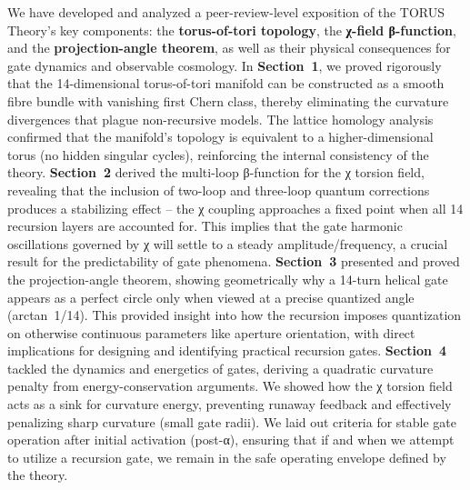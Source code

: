 \documentclass[]{article}
\begin{document}
We have developed and analyzed a peer-review-level exposition of the
TORUS Theory's key components: the \textbf{torus-of-tori topology}, the
\textbf{χ-field β-function}, and the \textbf{projection-angle theorem},
as well as their physical consequences for gate dynamics and observable
cosmology. In \textbf{Section~1}, we proved rigorously that the
14-dimensional torus-of-tori manifold can be constructed as a smooth
fibre bundle with vanishing first Chern class, thereby eliminating the
curvature divergences that plague non-recursive models. The lattice
homology analysis confirmed that the manifold's topology is equivalent
to a higher-dimensional torus (no hidden singular cycles), reinforcing
the internal consistency of the theory. \textbf{Section~2} derived the
multi-loop β-function for the χ torsion field, revealing that the
inclusion of two-loop and three-loop quantum corrections produces a
stabilizing effect -- the χ coupling approaches a fixed point when all
14 recursion layers are accounted for. This implies that the gate
harmonic oscillations governed by χ will settle to a steady
amplitude/frequency, a crucial result for the predictability of gate
phenomena. \textbf{Section~3} presented and proved the projection-angle
theorem, showing geometrically why a 14-turn helical gate appears as a
perfect circle only when viewed at a precise quantized angle
(arctan~1/14). This provided insight into how the recursion imposes
quantization on otherwise continuous parameters like aperture
orientation, with direct implications for designing and identifying
practical recursion gates. \textbf{Section~4} tackled the dynamics and
energetics of gates, deriving a quadratic curvature penalty from
energy-conservation arguments. We showed how the χ torsion field acts as
a sink for curvature energy, preventing runaway feedback and effectively
penalizing sharp curvature (small gate radii). We laid out criteria for
stable gate operation after initial activation (post-α), ensuring that
if and when we attempt to utilize a recursion gate, we remain in the
safe operating envelope defined by the theory.
\end{document}
